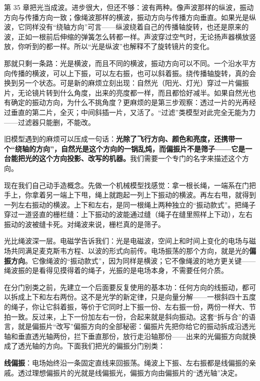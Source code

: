 第 35 章把光当成波。进步很大，但还不够：波有两种。像声波那样的纵波，振动方向与传播方向一致；像绳波那样的横波，振动方向与传播方向垂直。如果光是纵波，它同样没有“绕轴方向”可言——纵波绕着自己的传播轴旋转，也还是原来的波，正如一根前后伸缩的弹簧怎么转都一样。声波穿过空气时，无论扬声器横放竖放，你听到的都一样。所以“光是纵波”也解释不了旋转镜片的变化。

那就只剩一条路：光是横波，而且不同的横波，振动方向可以不同。一个沿水平方向传播的横波，可以上下振，可以左右振，也可以斜着振。绕传播轴旋转，真的会换到另一个状态。可是新的麻烦立刻出现：自然光（阳光、灯光）穿过一片偏振片，无论镜片转到什么角度，出来的亮度都一样，而且都恰好减半。如果自然光也有确定的振动方向，为什么不挑角度？更麻烦的是第三步观察：透过一片的光再经过垂直的第二片，全灭；中间斜插一片，又活了。“过滤”类模型对此完全无能为力——过滤器只能删，不能改。

\begin{mainline}
旧模型遇到的麻烦可以压成一句话：\textbf{光除了飞行方向、颜色和亮度，还携带一个“绕轴的方向”，自然光是这个方向的一锅乱炖，而偏振片不是筛子——它是一台能把光的这个方向投影、改写的机器。}我们需要一个专门的名字来描述这个方向。
\end{mainline}


现在我们自己动手造概念。先做一个机械模型找感觉：拿一根长绳，一端系在门把手上，你拿着另一端上下甩，绳上就跑起一列上下振动的横波。再左右甩，就得到一列左右振动的横波。上下和左右，是同一根绳上两种独立的“振动款式”。把绳子穿过一道竖直的栅栏缝：上下振动的波能通过缝（绳子在缝里照样上下动），左右振动的波被缝卡死。对绳波来说，栅栏真的是筛子。

光比绳波深一层。电磁学告诉我们：光是电磁波，空间上和时间上变化的电场与磁场共同满足麦克斯韦方程、以波的形式向前传。电场振荡的那个方向，就是光的\textbf{偏振方向}。它像绳波的“振动款式”，因为同样是横波；它不像绳波的地方更关键——绳波振的是看得见摸得着的绳子，光振的是电场本身，不需要任何介质。

在分门别类之前，先建立一个后面要反复使用的基本功：任何方向的线振动，都可以拆成上下和左右两份。这不是光学的新定律，只是向量分解——一根斜四十五度的绳子，你让它斜着振，等价于它同时上下振一份、左右振一份，两份一样大、节拍一致。反过来，上下一份加左右一份，合起来就是斜向振动。这套“拆与合”的语言，就是偏振片“改写”偏振方向的全部秘密：偏振片先把你给它的振动拆成沿透光轴和垂直透光轴两份，拦下垂直那份，放行走沿轴那份——出来的光偏振方向就换成了透光轴的方向。下面我们把光的偏振分门别类：

\textbf{线偏振}：电场始终沿一条固定直线来回振荡。绳波上下振、左右振都是线偏振的亲戚。透过理想偏振片的光就是线偏振光，偏振方向由偏振片的“透光轴”决定。

